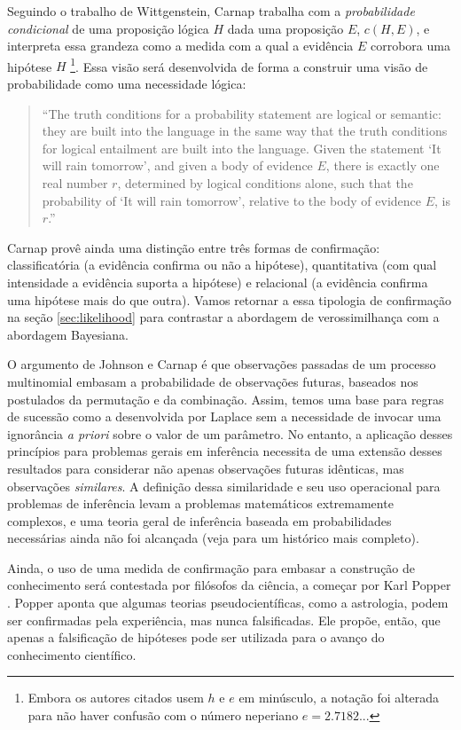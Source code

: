 Seguindo o trabalho de Wittgenstein, Carnap trabalha 
com a {\em probabilidade condicional} de uma proposição lógica $H$ dada uma proposição $E$, $c(H, E)$, 
e interpreta essa grandeza como a medida com a qual a evidência $E$ corrobora uma hipótese $H$ 
\citep{Zabell09}\footnote{Embora os autores citados usem $h$ e $e$ em minúsculo, a notação foi alterada para 
não haver confusão com o número neperiano $e = 2.7182...$}.
Essa visão será desenvolvida de forma a construir uma visão de probabilidade como uma necessidade lógica:

\begin{quote}
``The truth conditions for a probability statement are logical or semantic: they are built into the language in the same
way that the truth conditions for logical entailment are built into the language. Given the statement `It will rain tomorrow',
and given a body of evidence $E$, there is exactly one real number $r$, determined by logical conditions alone, such
that the probability of `It will rain tomorrow', relative to the body of evidence $E$, is $r$.'' \citep{Kyburg74}
\end{quote}

Carnap provê ainda uma distinção entre três formas de confirmação: classificatória (a evidência confirma ou não a hipótese),
quantitativa (com qual intensidade a evidência suporta a hipótese) e relacional (a evidência confirma uma hipótese mais do que
outra)\citep{Carnap62}. Vamos retornar a essa tipologia de confirmação na seção \ref{sec:likelihood} para contrastar
a abordagem de verossimilhança com a abordagem Bayesiana.

O argumento de Johnson e Carnap é que observações passadas de um processo multinomial embasam a probabilidade
de observações futuras, baseados nos postulados da permutação e da combinação. 
Assim, temos uma base para regras de sucessão como a 
desenvolvida por Laplace sem a necessidade de invocar uma ignorância {\em a priori} sobre o valor de um parâmetro. 
No entanto, a aplicação desses princípios para problemas gerais em inferência necessita de uma extensão desses resultados
para considerar não apenas observações futuras idênticas, mas observações {\em similares}. A definição dessa similaridade
e seu uso operacional para problemas de inferência levam a problemas matemáticos extremamente complexos, e uma teoria
geral de inferência baseada em probabilidades necessárias ainda não foi alcançada (veja \cite{Zabell09} para um histórico
mais completo).

Ainda, o uso de uma medida de confirmação para embasar a construção de conhecimento será contestada por filósofos
da ciência, a começar por Karl Popper \citep{Popper63}. Popper aponta que algumas teorias pseudocientíficas, como
a astrologia, podem ser confirmadas pela experiência, mas nunca falsificadas. Ele propõe, então, que apenas a 
falsificação de hipóteses pode ser utilizada para o avanço do conhecimento científico.

